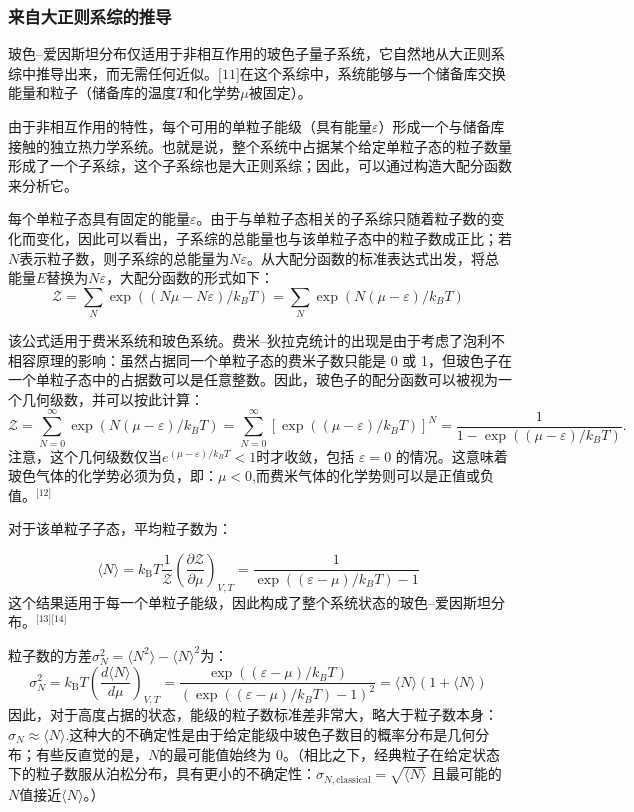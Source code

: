 \subsubsection{来自大正则系综的推导}  
玻色–爱因斯坦分布仅适用于非相互作用的玻色子量子系统，它自然地从大正则系综中推导出来，而无需任何近似。\(\text{[11]}\)在这个系综中，系统能够与一个储备库交换能量和粒子（储备库的温度\(T\)和化学势\(\mu\)被固定）。

由于非相互作用的特性，每个可用的单粒子能级（具有能量\(\varepsilon\)）形成一个与储备库接触的独立热力学系统。也就是说，整个系统中占据某个给定单粒子态的粒子数量形成了一个子系综，这个子系综也是大正则系综；因此，可以通过构造大配分函数来分析它。

每个单粒子态具有固定的能量\(\varepsilon\)。由于与单粒子态相关的子系综只随着粒子数的变化而变化，因此可以看出，子系综的总能量也与该单粒子态中的粒子数成正比；若\(N\)表示粒子数，则子系综的总能量为\(N\varepsilon\)。从大配分函数的标准表达式出发，将总能量\(E\)替换为\(N\varepsilon\)，大配分函数的形式如下：
\[
\mathcal{Z} = \sum_{N} \exp\left((N\mu - N\varepsilon)/k_B T\right) = \sum_{N} \exp\left(N(\mu - \varepsilon)/k_B T\right)~
\]

该公式适用于费米系统和玻色系统。费米–狄拉克统计的出现是由于考虑了泡利不相容原理的影响：虽然占据同一个单粒子态的费米子数只能是 0 或 1，但玻色子在一个单粒子态中的占据数可以是任意整数。因此，玻色子的配分函数可以被视为一个几何级数，并可以按此计算：
\[
\mathcal{Z} = \sum_{N=0}^{\infty} \exp\left(N(\mu - \varepsilon)/k_B T\right) = \sum_{N=0}^{\infty} \left[\exp\left((\mu - \varepsilon)/k_B T\right)\right]^N = \frac{1}{1 - \exp\left((\mu - \varepsilon)/k_B T\right)}.~
\]
注意，这个几何级数仅当\(e^{(\mu - \varepsilon)/k_B T} < 1\)时才收敛，包括 \( \varepsilon = 0 \) 的情况。这意味着玻色气体的化学势必须为负，即：\(\mu < 0\),而费米气体的化学势则可以是正值或负值。\(^\text{[12]}\)

对于该单粒子子态，平均粒子数为：

\[
\langle N \rangle = k_{\text{B}} T \frac{1}{\mathcal{Z}} \left( \frac{\partial \mathcal{Z}}{\partial \mu} \right)_{V,T} = \frac{1}{\exp\left( (\varepsilon - \mu)/k_B T\right) - 1}~
\]
这个结果适用于每一个单粒子能级，因此构成了整个系统状态的玻色–爱因斯坦分布。\(^\text{[13][14]}\)

粒子数的方差\(\sigma_N^2 = \langle N^2 \rangle - \langle N \rangle^2\)为：
\[
\sigma_N^2 = k_{\text{B}} T \left( \frac{d \langle N \rangle}{d\mu} \right)_{V,T} = \frac{\exp\left( (\varepsilon - \mu)/k_B T\right)}{\left( \exp\left( (\varepsilon - \mu)/k_B T\right) - 1 \right)^2} = \langle N \rangle (1 + \langle N \rangle)~
\]
因此，对于高度占据的状态，能级的粒子数标准差非常大，略大于粒子数本身：\(\sigma_N \approx \langle N \rangle\).这种大的不确定性是由于给定能级中玻色子数目的概率分布是几何分布；有些反直觉的是，\( N \)的最可能值始终为 0。（相比之下，经典粒子在给定状态下的粒子数服从泊松分布，具有更小的不确定性：\(\sigma_{N,{\text{classical}}} = \sqrt{\langle N \rangle}\)
且最可能的\( N\)值接近\(\langle N \rangle\)。）